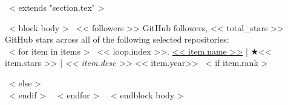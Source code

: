 ~< extends "section.tex" >~

~< block body >~
<< followers >> GitHub followers,
<< total_stars >> GitHub stars across all of the following selected repositories: \\

  ~< for item in items >~
    << loop.index >>.
    \href{<< item.repo_url >>}{<< item.name >>} | $\bigstar$<< item.stars >> |
    \emph{<< item.desc >>}
    \hfill << item.year>>
    ~< if item.rank >~
    \\ {\scriptsize \color{gray}{Rank \#<< item.rank >> among all contributors with << item.commits >> commits, << item.additons >> lines of additions and << item.deletions >> lines of deletions} \par}
    ~< else >~
      \\[0.5mm]
    ~< endif >~
  ~< endfor >~
~< endblock body >~
